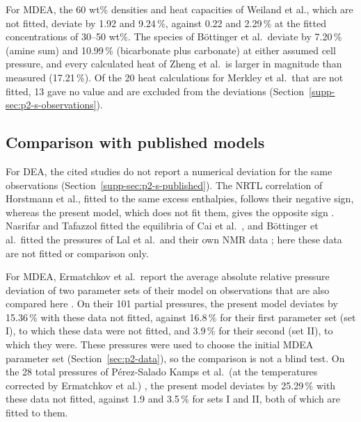 For MDEA, the 60 wt\% densities and heat capacities of Weiland et al., which are not fitted, deviate by 1.92 and 9.24\,\%, against 0.22 and 2.29\,\% at the fitted concentrations of 30--50 wt\%.
The species of B\"ottinger et al.\ deviate by 7.20\,\% (amine sum) and 10.99\,\% (bicarbonate plus carbonate) at either assumed cell pressure, and every calculated heat of Zheng et al.\ is larger in magnitude than measured (17.21\,\%).
Of the 20 heat calculations for Merkley et al.\ that are not fitted, 13 gave no value and are excluded from the deviations (Section~\ref{supp-sec:p2-s-observations}).

\subsection{Comparison with published models}\label{sec:p2-results-published}
For DEA, the cited studies do not report a numerical deviation for the same observations (Section~\ref{supp-sec:p2-s-published}).
The NRTL correlation of Horstmann et al., fitted to the same excess enthalpies, follows their negative sign, whereas the present model, which does not fit them, gives the opposite sign \cite[pp.~1496--1500, Tables~6--7, Fig.~4(b)]{horstmannPhaseEquilibriumExcess2002}.
Nasrifar and Tafazzol fitted the equilibria of Cai et al.\ \cite[Table~3, Fig.~5]{Nasrifar2010}, and B\"ottinger et al.\ fitted the pressures of Lal et al.\ and their own NMR data \cite[Sects.~5--7, Table~7, Fig.~11]{Bottinger2008}; here these data are not fitted or comparison only.

For MDEA, Ermatchkov et al.\ report the average absolute relative pressure deviation of two parameter sets of their model on observations that are also compared here \cite[Table~5, p.~6086]{ermatchkovSolubilityCarbonDioxide2006}.
On their 101 \COtwo partial pressures, the present model deviates by 15.36\,\% with these data not fitted, against 16.8\,\% for their first parameter set (set I), to which these data were not fitted, and 3.9\,\% for their second (set II), to which they were.
These pressures were used to choose the initial MDEA parameter set (Section~\ref{sec:p2-data}), so the comparison is not a blind test.
On the 28 total pressures of P\'erez-Salado Kamps et al.\ (at the temperatures corrected by Ermatchkov et al.) \cite[Table~6, p.~6088]{ermatchkovSolubilityCarbonDioxide2006}, the present model deviates by 25.29\,\% with these data not fitted, against 1.9 and 3.5\,\% for sets I and II, both of which are fitted to them.

